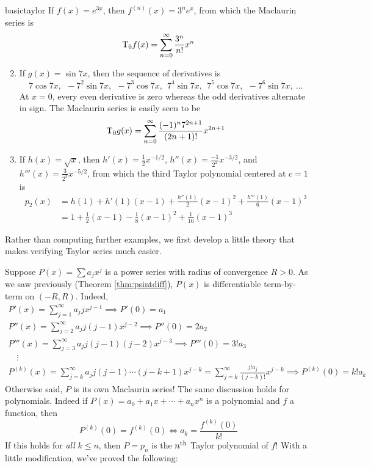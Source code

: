 \begin{examples}{}{basictaylor}
	\exstart If $f(x)=e^{3x}$, then $f^{(n)}(x)=3^ne^x$, from which the Maclaurin series is
	\[
	  \mathrm{T}_0 f(x)=\sum_{n=0}^\infty\frac{3^n}{n!}x^n
	\]
	\begin{enumerate}\setcounter{enumi}{1}
	  \item If $g(x)=\sin 7x$, then the sequence of derivatives is
	  \[
	  	7\cos 7x,\ \ -7^2\sin 7x,\ \ -7^3\cos 7x,\ \ 7^4\sin 7x,\ \ 7^5\cos 7x,\ \ -7^6\sin 7x,\ \ldots
	  \]
		At $x=0$, every even derivative is zero whereas the odd derivatives alternate in sign. The Maclaurin series is easily seen to be
	  \[
	  	\mathrm{T}_0 g(x)=\sum_{n=0}^\infty\frac{(-1)^n7^{2n+1}}{(2n+1)!}x^{2n+1}
	  \]
	  
	  \item\label{ex:basictaylor3} If $h(x)=\sqrt x$, then $h'(x)=\frac 12x^{-1/2}$, $h''(x)=\frac{-1}{2^2}x^{-3/2}$, and $h'''(x)=\frac{3}{2^3}x^{-5/2}$, from which the third Taylor polynomial centered at $c=1$ is
	  \begin{align*}
	  	p_2(x)&=h(1)+h'(1)(x-1)+\frac{h''(1)}{2}(x-1)^2+\frac{h'''(1)}{6}(x-1)^3\\
	  	&=1+\frac 12(x-1)-\frac 18(x-1)^2+\frac 1{16}(x-1)^3
	  \end{align*}
	\end{enumerate}
\end{examples}

Rather than computing further examples, we first develop a little theory that makes verifying Taylor series much easier.
\goodbreak


	
	
Suppose $P(x)=\sum a_jx^j$ is a power series with radius of convergence $R>0$. As we saw previously (Theorem \ref{thm:psintdiff}), $P(x)$ is differentiable term-by-term on $(-R,R)$. Indeed,
\begin{gather*}
	P'(x)=\sum_{j=1}^\infty a_jjx^{j-1} \implies P'(0)=a_1\\
	P''(x)=\sum_{j=2}^\infty a_jj(j-1)x^{j-2} \implies P''(0)=2a_2\\
	P'''(x)=\sum_{j=3}^\infty a_jj(j-1)(j-2)x^{j-3} \implies P'''(0)=3!a_3\\[-8pt]
	\quad\vdots\\[-3pt]
	P^{(k)}(x)=\sum_{j=k}^\infty a_jj(j-1)\cdots(j-k+1)x^{j-k}=\sum_{j=k}^\infty\frac{j!a_j}{(j-k)!}x^{j-k} \implies P^{(k)}(0)=k!a_k
\end{gather*}
Otherwise said, $P$ is its own Maclaurin series! The same discussion holds for polynomials. Indeed if $P(x)=a_0+a_1x+\cdots+a_nx^n$ is a polynomial and $f$ a function, then
\[
	P^{(k)}(0)=f^{(k)}(0)\iff a_k=\frac{f^{(k)}(0)}{k!}
\]
If this holds for \emph{all} $k\le n$, then $P=p_n$ is the $n\textsuperscript{th}$ Taylor polynomial of $f$! With a little modification, we've proved the following:

